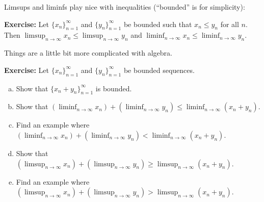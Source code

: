 \documentclass[10pt,aspectratio=169]{beamer}
\begin{document}
\begin{frame}

Limsups and liminfs play nice with inequalities (``bounded'' is for simplicity):

\pause
\medskip

\textbf{Exercise:}
Let $\{ x_n \}_{n=1}^\infty$ and $\{ y_n \}_{n=1}^\infty$ be bounded such that
$x_n \leq y_n$ for all $n$.  Then
\quad
$\displaystyle
\limsup_{n\to\infty} x_n \leq
\limsup_{n\to\infty} y_n$
\quad
and
\quad
$\displaystyle
\liminf_{n\to\infty} x_n \leq
\liminf_{n\to\infty} y_n$.

\pause
\medskip

Things are a little bit more complicated with algebra.

\pause
\medskip

\textbf{Exercise:}
Let $\{ x_n \}_{n=1}^\infty$ and $\{ y_n \}_{n=1}^\infty$ be bounded sequences.
\begin{enumerate}[a)]
\item\pause
Show that $\{ x_n + y_n \}_{n=1}^\infty$ is bounded.
\item
Show that
\quad $\displaystyle
\left(\liminf_{n\to \infty} x_n\right)
+
\left(\liminf_{n\to \infty} y_n\right)
\leq
\liminf_{n\to \infty} (x_n+y_n)$.
\item\pause
Find an example where
$\displaystyle
\left(\liminf_{n\to \infty} x_n\right)
+
\left(\liminf_{n\to \infty} y_n\right)
<
\liminf_{n\to \infty} (x_n+y_n)$.
\item\pause
Show that
\quad $\displaystyle
\left(\limsup_{n\to \infty} x_n\right)
+
\left(\limsup_{n\to \infty} y_n\right)
\geq
\limsup_{n\to \infty} (x_n+y_n)$.
\item\pause
Find an example where
$\displaystyle
\left(\limsup_{n\to \infty} x_n\right)
+
\left(\limsup_{n\to \infty} y_n\right)
>
\limsup_{n\to \infty} (x_n+y_n)$.
\end{enumerate}

\end{frame}
\end{document}
